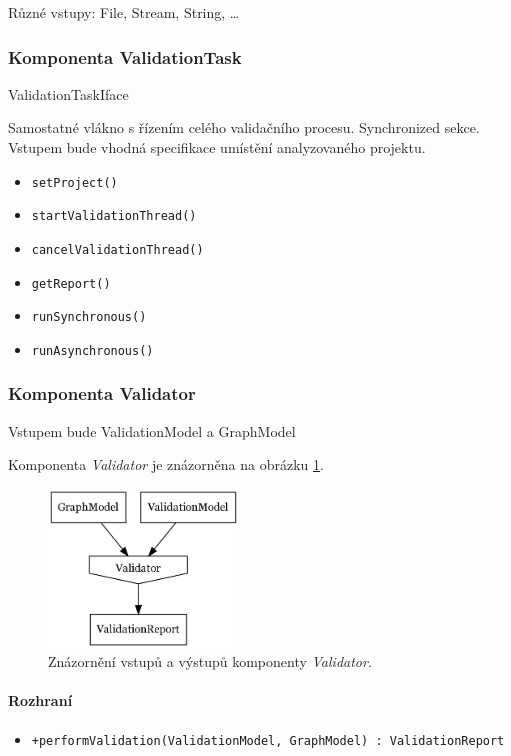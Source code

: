 Různé vstupy: File, Stream, String, \ldots

\subsubsection{Komponenta ValidationTask}
ValidationTaskIface

Samostatné vlákno s řízením celého validačního procesu. Synchronized sekce. Vstupem bude vhodná specifikace umístění analyzovaného projektu.

\begin{itemize}
\item \verb+setProject()+
\item \verb+startValidationThread()+
\item \verb+cancelValidationThread()+
\item \verb+getReport()+
\item \verb+runSynchronous()+
\item \verb+runAsynchronous()+
\end{itemize}

\subsubsection{Komponenta Validator}
Vstupem bude ValidationModel a GraphModel

Komponenta \emph{Validator} je znázorněna na obrázku \ref{design-validator_io}.

\begin{figure}[h!]
  \centering
  \includegraphics[width=0.45\textwidth]{./graphs/validator_io_graph.png}
  \caption{Znázornění vstupů a výstupů komponenty \emph{Validator}.\label{design-validator_io}}
\end{figure}

\paragraph{Rozhraní}
\begin{itemize}
\item \verb-+performValidation(ValidationModel, GraphModel) : ValidationReport-
\end{itemize}

